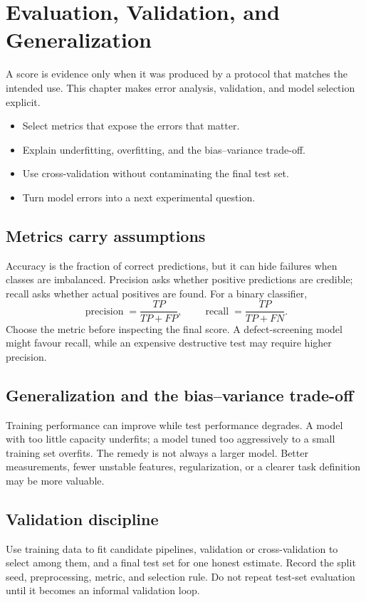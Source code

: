 \chapter{Evaluation, Validation, and Generalization}\label{chap:evaluation}
 A score is evidence only when it was produced by a protocol that matches the intended use. This chapter makes error analysis, validation, and model selection explicit.

\begin{learningbox}
\begin{itemize}
  \item Select metrics that expose the errors that matter.
  \item Explain underfitting, overfitting, and the bias--variance trade-off.
  \item Use cross-validation without contaminating the final test set.
  \item Turn model errors into a next experimental question.
\end{itemize}
\end{learningbox}

\section{Metrics carry assumptions}
Accuracy is the fraction of correct predictions, but it can hide failures when classes are imbalanced. Precision asks whether positive predictions are credible; recall asks whether actual positives are found. For a binary classifier,
\[
\operatorname{precision}=\frac{TP}{TP+FP},\qquad
\operatorname{recall}=\frac{TP}{TP+FN}.
\]
Choose the metric before inspecting the final score. A defect-screening model might favour recall, while an expensive destructive test may require higher precision.

\section{Generalization and the bias--variance trade-off}
Training performance can improve while test performance degrades. A model with too little capacity underfits; a model tuned too aggressively to a small training set overfits. The remedy is not always a larger model. Better measurements, fewer unstable features, regularization, or a clearer task definition may be more valuable.

\section{Validation discipline}
Use training data to fit candidate pipelines, validation or cross-validation to select among them, and a final test set for one honest estimate. Record the split seed, preprocessing, metric, and selection rule. Do not repeat test-set evaluation until it becomes an informal validation loop.

